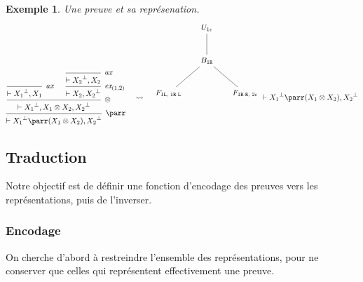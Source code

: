 \documentclass[11pt,a4paper]{article}
\newtheorem{example}{Exemple}
\newcommand*{\orth}{^\perp}
\newcommand*{\tensor}{\otimes}
\newcommand*{\axv}[1]{\infer{0}[\ensuremath{\mathit{ax}}]{\vdash #1}}
\newcommand*{\tensorv}[1]{\infer{2}[\ensuremath{\tensor}]{\vdash #1}}
\newcommand*{\parrv}[1]{\infer{1}[\ensuremath{\parr}]{\vdash #1}}
\newcommand*{\permv}[2]{\infer{1}[\ensuremath{\textit{ex}_{#1}}]{\vdash #2}}
\newcommand*{\Left}{\textnormal{\texttt{L}}}
\newcommand*{\Right}{\textnormal{\texttt{R}}}
\begin{document}
\begin{example}
Une preuve et sa représenation.
\begin{equation*}
\begin{prooftree}
    \axv{{X_1}\orth, X_1}
    \axv{{X_2}\orth, X_2}
    \permv{(1,2)}{X_2, {X_2}\orth}
    \tensorv{{X_1}\orth, X_1 \tensor X_2, {X_2}\orth}
    \parrv{{X_1}\orth \parr (X_1 \tensor X_2), {X_2}\orth}
\end{prooftree}
\quad\leadsto\quad
\begin{tikzpicture}%
    [level distance=1.5cm,
    level 2/.style={sibling distance=3.5cm}]
    \node {$U_{1 \epsilon}$}
    child {node {$B_{1 \Right}$}
        child {node {$F_{1 \Left, \; 1 \Right \cdot \Left}$}}
        child {node {$F_{1 \Right \cdot \Right, \; 2 \epsilon}$}}
    };
\end{tikzpicture}
\vdash {X_1}\orth \parr (X_1 \tensor X_2), {X_2}\orth
\end{equation*}
\end{example}

\subsection{Traduction}
Notre objectif est de définir une fonction d'encodage des preuves vers les représentations, puis de l'inverser.

\subsubsection{Encodage}
On cherche d'abord à restreindre l'ensemble des représentations, pour ne conserver que celles qui représentent effectivement une preuve.
\end{document}
